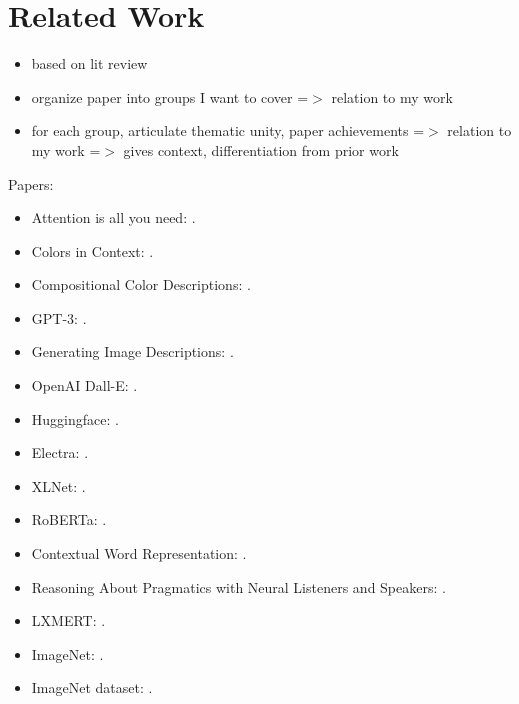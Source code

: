 \section{Related Work}

\begin{itemize}
  \item based on lit review
  \item organize paper into groups I want to cover =$>$ relation to my work
  \item for each group, articulate thematic unity, paper achievements =$>$ relation to my work =$>$ gives context, differentiation from prior work
\end{itemize}

Papers:

\begin{itemize}
  \item Attention is all you need: \citep{vaswani-2017-attention}.
  \item Colors in Context: \citep{monroe-2017-colors}.
  \item Compositional Color Descriptions: \citep{monroe-2016-compositional}.
  \item GPT-3: \citep{brown-2020-gpt3}.
  \item Generating Image Descriptions: \citep{karpathy-2014-image_descriptions}.
  \item OpenAI Dall-E: \citep{openai-2020-dalle}.
  \item Huggingface: \citep{wolf-2019-huggingface}.
  \item Electra: \citep{clark-2020-electra}.
  \item XLNet: \citep{yang-2019-xlnet}.
  \item RoBERTa: \citep{liu-2019-roberta}.
  \item Contextual Word Representation: \citep{smith-2019-contextual}.
  \item Reasoning About Pragmatics with Neural Listeners and Speakers: \citep{andreas-2016-reasoning}.
  \item LXMERT: \citep{tan-2019-lxmert}.
  \item ImageNet: \citep{deng-2009-imagenet}.
  \item ImageNet dataset: \citep{imagenet-2019-dataset}.
\end{itemize}
